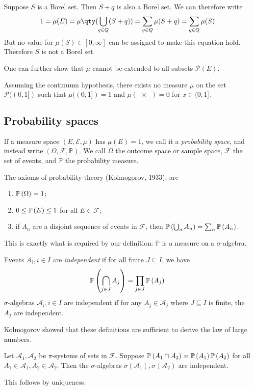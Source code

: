 Suppose $S$ is a Borel set.
Then $S + q$ is also a Borel set.
We can therefore write
\[ 1 = \mu(E) = \mu\qty(\bigcup_{q \in Q}(S+q)) = \sum_{q \in Q} \mu(S+q) = \sum_{q \in Q} \mu(S) \]
But no value for $\mu(S) \in [0,\infty]$ can be assigned to make this equation hold.
Therefore $S$ is not a Borel set.

One can further show that $\mu$ cannot be extended to all subsets $\mathcal P(E)$.
\begin{theorem}
	Assuming the continuum hypothesis, there exists no measure $\mu$ on the set $\mathcal P((0,1])$ such that $\mu((0,1]) = 1$ and $\mu(\qty{x}) = 0$ for $x \in (0,1]$.
\end{theorem}

\subsection{Probability spaces}
\begin{definition}
	If a measure space $(E, \mathcal E, \mu)$ has $\mu(E) = 1$, we call it a \emph{probability space}, and instead write $(\Omega, \mathcal F, \mathbb P)$.
	We call $\Omega$ the outcome space or sample space, $\mathcal F$ the set of events, and $\mathbb P$ the probability measure.
\end{definition}
The axioms of probability theory (Kolmogorov, 1933), are
\begin{enumerate}
	\item $\mathbb{P}\left({\Omega}\right) = 1$;
	\item $0 \leq \mathbb{P}\left({E}\right) \leq 1$ for all $E \in \mathcal F$;
	\item if $A_n$ are a disjoint sequence of events in $\mathcal F$, then $\mathbb{P}\left({\bigcup_n A_n}\right) = \sum_n \mathbb{P}\left({A_n}\right)$.
\end{enumerate}
This is exactly what is required by our definition: $\mathbb P$ is a measure on a $\sigma$-algebra.
\begin{definition}
	Events $A_i, i \in I$ are \emph{independent} if for all finite $J \subseteq I$, we have
	\[ \mathbb{P}\left({\bigcap_{j \in J} A_j}\right) = \prod_{j \in J} \mathbb{P}\left({A_j}\right) \]
	$\sigma$-algebras $\mathcal A_i, i \in I$ are independent if for any $A_j \in \mathcal A_j$ where $J \subseteq I$ is finite, the $A_j$ are independent.
\end{definition}
Kolmogorov showed that these definitions are sufficient to derive the law of large numbers.
\begin{proposition}
	Let $\mathcal A_1, \mathcal A_2$ be $\pi$-systems of sets in $\mathcal F$.
	Suppose $\mathbb{P}\left({A_1 \cap A_2}\right) = \mathbb{P}\left({A_1}\right) \mathbb{P}\left({A_2}\right)$ for all $A_1 \in \mathcal A_1, A_2 \in \mathcal A_2$.
	Then the $\sigma$-algebras $\sigma(\mathcal A_1), \sigma(\mathcal A_2)$ are independent.
\end{proposition}
This follows by uniqueness.

